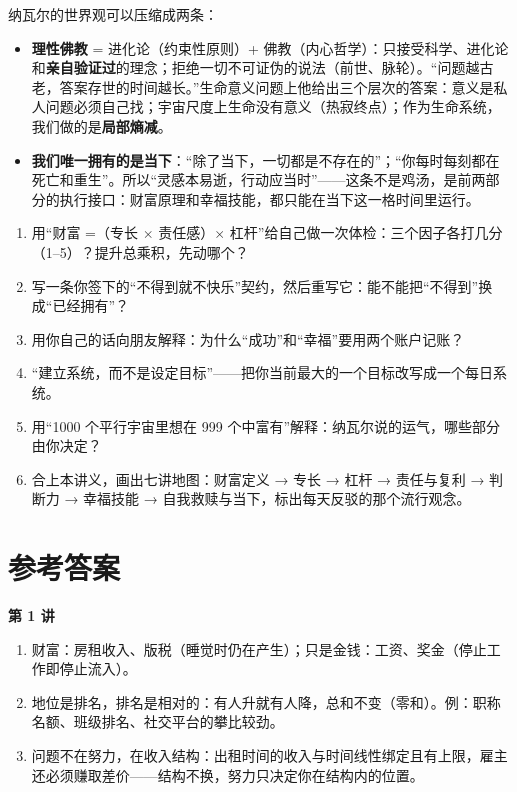 \documentclass[UTF8,a4paper,11pt]{ctexart}
\begin{document}
纳瓦尔的世界观可以压缩成两条：

\begin{itemize}
  \item \textbf{理性佛教} = 进化论（约束性原则）+ 佛教（内心哲学）：只接受科学、进化论和\textbf{亲自验证过}的理念；拒绝一切不可证伪的说法（前世、脉轮）。“问题越古老，答案存世的时间越长。”生命意义问题上他给出三个层次的答案：意义是私人问题必须自己找；宇宙尺度上生命没有意义（热寂终点）；作为生命系统，我们做的是\textbf{局部熵减}。
  \item \textbf{我们唯一拥有的是当下}：“除了当下，一切都是不存在的”；“你每时每刻都在死亡和重生”。所以“灵感本易逝，行动应当时”——这条不是鸡汤，是前两部分的执行接口：财富原理和幸福技能，都只能在当下这一格时间里运行。
\end{itemize}

\begin{exercise}[总检验]
\begin{enumerate}
  \item 用“财富 =（专长 $\times$ 责任感）$\times$ 杠杆”给自己做一次体检：三个因子各打几分（1–5）？提升总乘积，先动哪个？
  \item 写一条你签下的“不得到就不快乐”契约，然后重写它：能不能把“不得到”换成“已经拥有”？
  \item 用你自己的话向朋友解释：为什么“成功”和“幸福”要用两个账户记账？
  \item “建立系统，而不是设定目标”——把你当前最大的一个目标改写成一个每日系统。
  \item 用“1000 个平行宇宙里想在 999 个中富有”解释：纳瓦尔说的运气，哪些部分由你决定？
  \item 合上本讲义，画出七讲地图：财富定义 → 专长 → 杠杆 → 责任与复利 → 判断力 → 幸福技能 → 自我救赎与当下，标出每天反驳的那个流行观念。
\end{enumerate}
\end{exercise}

\newpage

\section*{参考答案}

\textbf{第 1 讲}
\begin{enumerate}
  \item 财富：房租收入、版税（睡觉时仍在产生）；只是金钱：工资、奖金（停止工作即停止流入）。
  \item 地位是排名，排名是相对的：有人升就有人降，总和不变（零和）。例：职称名额、班级排名、社交平台的攀比较劲。
  \item 问题不在努力，在收入结构：出租时间的收入与时间线性绑定且有上限，雇主还必须赚取差价——结构不换，努力只决定你在结构内的位置。
\end{enumerate}
\end{document}
